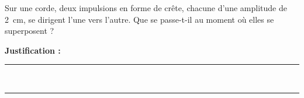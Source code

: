 Sur une corde, deux impulsions en forme de crête, chacune d'une amplitude de \qty{2}{cm}, se dirigent l'une vers l'autre. Que se passe-t-il au moment où elles se superposent ?

\choices

\noindent\textbf{Justification :} \hrulefill \\[2.5ex]
\rule{\linewidth}{0.4pt} \\[2.5ex]
\rule{\linewidth}{0.4pt}
\vfill
